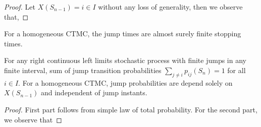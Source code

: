 \documentclass[a4paper,10pt,english]{article}
\begin{document}
\begin{proof}
Let $X(S_{n-1}) = i \in I$ without any loss of generality, then we observe that,
\end{proof}
\begin{cor} 
For a homogeneous CTMC, the jump times are almost surely finite stopping times. 
\end{cor}
\begin{lem}\label{Lemma:JumpProb}
For any right continuous left limits stochastic process with finite jumps in any finite interval, sum of jump transition probabilities $\sum_{j \neq i}p_{ij}(S_n) = 1$ for all $i \in I$. 
For a homogeneous CTMC, jump probabilities are depend solely on $X(S_{n-1})$ and independent of jump instants.  
\end{lem}
\begin{proof}
First part follows from simple law of total probability. 
For the second part, we observe that 
\end{proof}
\end{document}
